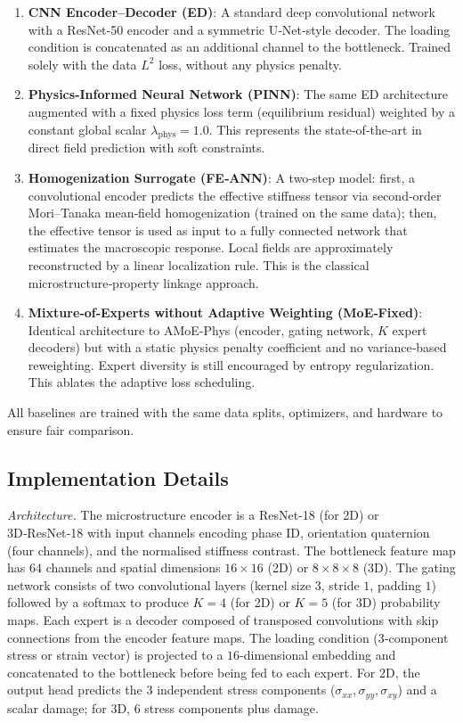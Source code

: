 \documentclass{article}
\begin{document}
\begin{enumerate}
    \item \textbf{CNN Encoder–Decoder (ED)}: A standard deep convolutional network with a ResNet‑50 encoder and a symmetric U‑Net‑style decoder. The loading condition is concatenated as an additional channel to the bottleneck. Trained solely with the data $L^2$ loss, without any physics penalty.
    \item \textbf{Physics-Informed Neural Network (PINN)}: The same ED architecture augmented with a fixed physics loss term (equilibrium residual) weighted by a constant global scalar $\lambda_{\text{phys}} = 1.0$. This represents the state‑of‑the‑art in direct field prediction with soft constraints.
    \item \textbf{Homogenization Surrogate (FE‑ANN)}: A two‑step model: first, a convolutional encoder predicts the effective stiffness tensor via second‑order Mori–Tanaka mean‑field homogenization (trained on the same data); then, the effective tensor is used as input to a fully connected network that estimates the macroscopic response. Local fields are approximately reconstructed by a linear localization rule. This is the classical microstructure‑property linkage approach.
    \item \textbf{Mixture‑of‑Experts without Adaptive Weighting (MoE‑Fixed)}: Identical architecture to AMoE‑Phys (encoder, gating network, $K$ expert decoders) but with a static physics penalty coefficient and no variance‑based reweighting. Expert diversity is still encouraged by entropy regularization. This ablates the adaptive loss scheduling.
\end{enumerate}

All baselines are trained with the same data splits, optimizers, and hardware to ensure fair comparison.

\subsection{Implementation Details}
\textit{Architecture.} The microstructure encoder is a ResNet‑18 (for 2D) or 3D‑ResNet‑18 with input channels encoding phase ID, orientation quaternion (four channels), and the normalised stiffness contrast. The bottleneck feature map has $64$ channels and spatial dimensions $16\times16$ (2D) or $8\times8\times8$ (3D). The gating network consists of two convolutional layers (kernel size $3$, stride $1$, padding $1$) followed by a softmax to produce $K=4$ (for 2D) or $K=5$ (for 3D) probability maps. Each expert is a decoder composed of transposed convolutions with skip connections from the encoder feature maps. The loading condition (3‑component stress or strain vector) is projected to a $16$‑dimensional embedding and concatenated to the bottleneck before being fed to each expert. For 2D, the output head predicts the $3$ independent stress components ($\sigma_{xx},\sigma_{yy},\sigma_{xy}$) and a scalar damage; for 3D, $6$ stress components plus damage.
\end{document}
